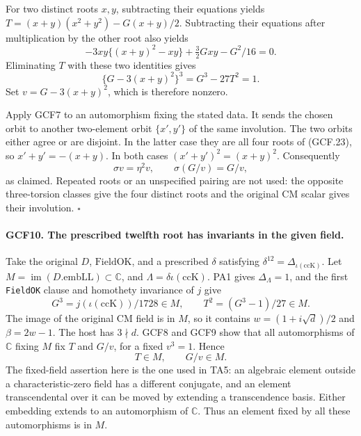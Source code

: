 \documentclass[11pt,a4paper]{article}
\numberwithin{equation}{section}
\theoremstyle{remark}\newtheorem{remark}[theorem]{Remark}
\begin{document}
For two distinct roots \(x,y\), subtracting their equations yields
\(T=(x+y)(x^2+y^2)-G(x+y)/2\).  Subtracting their equations after
multiplication by the other root also yields
\[
 -3xy\{(x+y)^2-xy\}+\tfrac32Gxy-G^2/16=0.
\]
Eliminating \(T\) with these two identities gives
\[
                   \{G-3(x+y)^2\}^3=G^3-27T^2=1.     \tag{GCF.24}
\]
Set \(v=G-3(x+y)^2\), which is therefore nonzero.

Apply GCF7 to an automorphism fixing the stated data.  It sends the
chosen orbit to another two-element orbit \(\{x',y'\}\) of the
same involution.  The two orbits either agree or are disjoint.
In the latter case they are all four roots of (GCF.23), so
\(x'+y'=-(x+y)\).  In both cases
\((x'+y')^2=(x+y)^2\).  Consequently
\[
 \sigma v=\eta^2v,\qquad
                 \sigma(G/v)=G/v,                   \tag{GCF.25}
\]
as claimed.  Repeated roots or an unspecified pairing are not used:
the opposite three-torsion classes give the four distinct roots and
the original CM scalar gives their involution.
\hfill\(\square\)

\paragraph{GCF10. The prescribed twelfth root has invariants in the given field.}
\label{claim:GCF10}
Take the original \(D\), \(\mathrm{FieldOK}\), and a prescribed
\(\delta\) satisfying
\(\delta^{12}=\Delta_{\iota(\mathrm{ccK})}\).
Let \(M=\operatorname{im}(D.\mathrm{embLL})\subset\mathbb C\),
and \(\Lambda=\delta\iota(\mathrm{ccK})\).
PA1 gives \(\Delta_\Lambda=1\), and the first \texttt{Field\allowbreak OK}
clause and homothety invariance of \(j\) give
\[
  G^3=j(\iota(\mathrm{ccK}))/1728\in M,\qquad
                    T^2=(G^3-1)/27\in M.             \tag{GCF.26}
\]
The image of the original CM field is in \(M\), so it contains
\(w=(1+i\sqrt d)/2\) and \(\beta=2w-1\).
The host has \(3\nmid d\).  GCF8 and GCF9 show that all
automorphisms of \(\mathbb C\) fixing \(M\) fix \(T\) and
\(G/v\), for a fixed \(v^3=1\).  Hence
\[
                              T\in M,\qquad G/v\in M.
 \tag{GCF.27}
\]
The fixed-field assertion here is the one used in TA5: an algebraic
element outside a characteristic-zero field has a different conjugate,
and an element transcendental over it can be moved by extending a
transcendence basis.  Either embedding extends to an automorphism of
\(\mathbb C\).  Thus an element fixed by all these automorphisms is
in \(M\).
\end{document}
